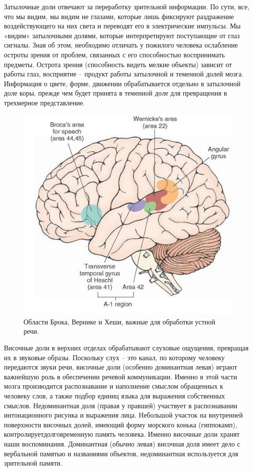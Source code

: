 \documentclass[pdftex,ptm,12pt,a4paper]{report}
\theoremstyle{definition}
\begin{document}
Затылочные доли отвечают за переработку зрительной информации. По сути, все, что мы видим, мы видим не глазами, которые лишь фиксируют раздражение воздействующего на них света и переводят его в электрические импульсы. Мы «видим» затылочными долями, которые интерпретируют поступающие от глаз сигналы. Зная об этом, необходимо отличать у пожилого человека ослабление остроты зрения от проблем, связанных с его способностью воспринимать предметы. Острота зрения (способность видеть мелкие объекты) зависит от работы глаз, восприятие – продукт работы затылочной и теменной долей мозга. Информация о цвете, форме, движении обрабатывается отдельно в затылочной доле коры, прежде чем будет принята в теменной доле для превращения в трехмерное представление. 

\begin{figure}[h]
\includegraphics[scale=0.4]{images/brain_anatomy.jpg}
\centering
\caption{Области Брока, Вернике и Хеши, важные для обработки устной речи.}
\label{broc_vernike}
\end{figure}

Височные доли в верхних отделах обрабатывают слуховые ощущения, превращая их в звуковые образы. Поскольку слух – это канал, по которому человеку передаются звуки речи, височные доли (особенно доминантная левая) играют важнейшую роль в обеспечении речевой коммуникации.
Именно в этой части мозга производится распознавание и наполнение смыслом обращенных к человеку слов, а также подбор единиц языка для выражения собственных смыслов. Недоминантная доля (правая у правшей) участвует в распознавании интонационного рисунка и выражения лица. 
Небольшой участок на внутренней поверхности височных долей, имеющий форму морского конька (гиппокамп), контролируетдолговременную память человека. Именно височные доли хранят наши воспоминания. Доминантная (обычно левая) височная доля имеет дело с вербальной памятью и названиями объектов, недоминантная используется для зрительной памяти.
\end{document}
